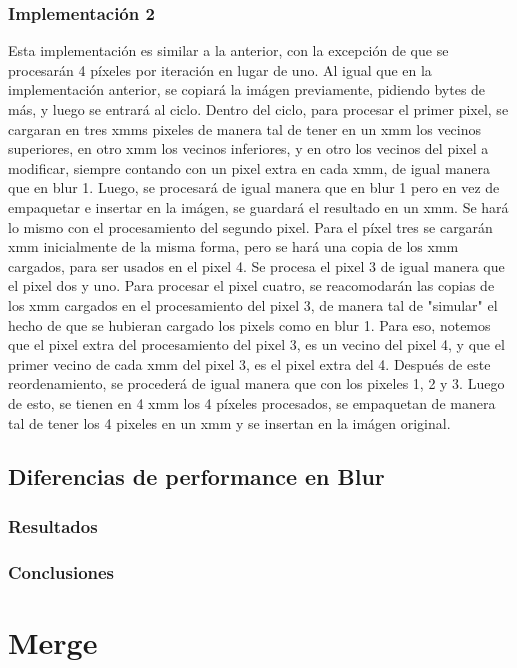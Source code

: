 \documentclass[a4paper]{article}
\begin{document}
\subsubsection{Implementación 2}

Esta implementación es similar a la anterior, con la excepción de que se procesarán 4 píxeles por iteración en lugar de uno. Al igual que en la implementación anterior, se copiará la imágen previamente, pidiendo bytes de más, y luego se entrará al ciclo. Dentro del ciclo, para procesar el primer pixel, se cargaran en tres xmms pixeles de manera tal de tener en un xmm los vecinos superiores, en otro xmm los vecinos inferiores, y en otro los vecinos del pixel a modificar, siempre contando con un pixel extra en cada xmm, de igual manera que en blur 1. Luego, se procesará de igual manera que en blur 1 pero en vez de empaquetar e insertar en la imágen, se guardará el resultado en un xmm. Se hará lo mismo con el procesamiento del segundo pixel. Para el píxel tres se cargarán xmm inicialmente de la misma forma, pero se hará una copia de los xmm cargados, para ser usados en el pixel 4. Se procesa el pixel 3 de igual manera que el pixel dos y uno. Para procesar el pixel cuatro, se reacomodarán las copias de los xmm cargados en el procesamiento del pixel 3, de manera tal de "simular" el hecho de que se hubieran cargado los pixels como en blur 1. Para eso, notemos que el pixel extra del procesamiento del pixel 3, es un vecino del pixel 4, y que el primer vecino de cada xmm del pixel 3, es el pixel extra del 4. Después de este reordenamiento, se procederá de igual manera que con los pixeles 1, 2 y 3.
Luego de esto, se tienen en 4 xmm los 4 píxeles procesados, se empaquetan de manera tal de tener los 4 pixeles en un xmm y se insertan en la imágen original.

\subsection{Diferencias de performance en Blur}


\subsubsection{Resultados}


\subsubsection{Conclusiones}


\newpage
\section{Merge}
\end{document}
